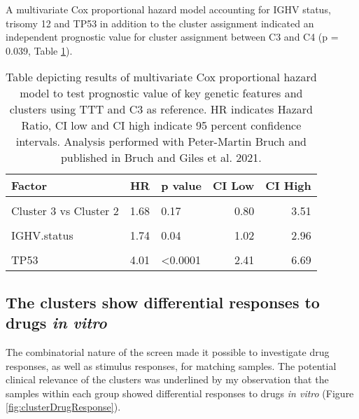 \documentclass[11pt, a4paper, twosided]{book}
\begin{document}
A multivariate Cox proportional hazard model accounting for IGHV status, trisomy 12 and TP53 in addition to the cluster assignment indicated an independent prognostic value for cluster assignment between C3 and C4 (p = 0.039, Table \ref{tab:clusterCox}).
\begin{table}

\caption{\label{tab:clusterCox}Table depicting results of multivariate Cox proportional hazard model to test prognostic value of key genetic features and clusters using TTT and C3 as reference. HR indicates Hazard Ratio, CI low and CI high indicate 95 percent confidence intervals. Analysis performed with Peter-Martin Bruch and published in Bruch and Giles et al. 2021.}
\centering
\fontsize{7}{9}\selectfont
\begin{tabular}[t]{l|r|l|r|r}
\hline
Factor & HR & p value & CI Low & CI High\\
\hline
\cellcolor[HTML]{E2E868}{Cluster 3 vs Cluster 1} & \cellcolor[HTML]{E2E868}{0.96} & \cellcolor[HTML]{E2E868}{0.89} & \cellcolor[HTML]{E2E868}{0.54} & \cellcolor[HTML]{E2E868}{1.72}\\
\hline
Cluster 3 vs Cluster 2 & 1.68 & 0.17 & 0.80 & 3.51\\
\hline
\cellcolor[HTML]{E2E868}{Cluster 3 vs Cluster 4} & \cellcolor[HTML]{E2E868}{0.44} & \cellcolor[HTML]{E2E868}{0.04} & \cellcolor[HTML]{E2E868}{0.20} & \cellcolor[HTML]{E2E868}{0.96}\\
\hline
IGHV.status & 1.74 & 0.04 & 1.02 & 2.96\\
\hline
\cellcolor[HTML]{E2E868}{trisomy 12} & \cellcolor[HTML]{E2E868}{0.87} & \cellcolor[HTML]{E2E868}{0.71} & \cellcolor[HTML]{E2E868}{0.44} & \cellcolor[HTML]{E2E868}{1.76}\\
\hline
TP53 & 4.01 & <0.0001 & 2.41 & 6.69\\
\hline
\end{tabular}
\end{table}
\hypertarget{the-clusters-show-differential-responses-to-drugs-in-vitro}{%
\subsection{\texorpdfstring{The clusters show differential responses to drugs \emph{in vitro}}{The clusters show differential responses to drugs in vitro}}\label{the-clusters-show-differential-responses-to-drugs-in-vitro}}

The combinatorial nature of the screen made it possible to investigate drug responses, as well as stimulus responses, for matching samples. The potential clinical relevance of the clusters was underlined by my observation that the samples within each group showed differential responses to drugs \emph{in vitro} (Figure \ref{fig:clusterDrugResponse}).
\end{document}
